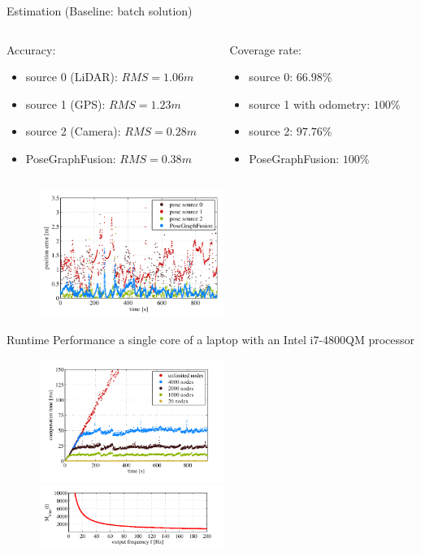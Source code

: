 \documentclass[10pt]{beamer}
\begin{document}
	\begin{frame}{Estimation (Baseline: batch solution)}
		\begin{columns}
			\begin{column}{0.5\textwidth}
				Accuracy:
				\begin{itemize}
					\item source 0 (LiDAR): $RMS=1.06m$
					\item source 1 (GPS): $RMS=1.23m$
					\item source 2 (Camera): $RMS=0.28m$
					\item PoseGraphFusion: $RMS=0.38m$
				\end{itemize}
			\end{column}
			\begin{column}{0.5\textwidth}
				Coverage rate:
				\begin{itemize}
					\item source 0: $66.98\%$
					\item source 1 with odometry: $100\%$
					\item source 2: $97.76\%$
					\item PoseGraphFusion: $100\%$
				\end{itemize}
			\end{column}
		\end{columns}		
		\begin{figure}[!ht]
			\centering
			\includegraphics[width=6cm]{./img/error.png}
		\end{figure}
	\end{frame}

	\begin{frame}{Runtime Performance}
		a single core of a laptop with an Intel i7-4800QM processor
		\begin{figure}[!ht]
			\centering
			\includegraphics[width=6cm]{./img/runtime.png}\\
			\includegraphics[width=6cm]{./img/relationship.png}
		\end{figure}
	\end{frame}
\end{document}
